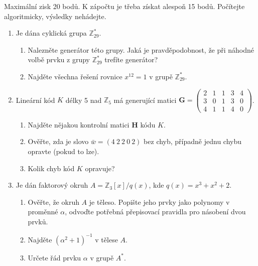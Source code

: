 \documentclass[11pt, a4paper]{article}
\begin{document}
\title{}
\author{Jakub Adamec\\B2M01TIK}

\maketitle
Maximální zisk 20 bodů. K zápočtu je třeba získat alespoň 15 bodů. Počítejte algoritmicky, výsledky nehádejte.
\begin{enumerate}
    \item \relax [4 body] Je dána cyklická grupa $\mathbb{Z}_{29}^*$.
    \begin{enumerate}
        \item \relax [2 body] Nalezněte generátor této grupy. Jaká je pravděpodobnost, že při náhodné volbě prvku z grupy $\mathbb{Z}_{29}^*$ trefíte generátor?
        \item \relax [2 body] Najděte všechna řešení rovnice $x^{12} = 1$ v grupě $\mathbb{Z}_{29}^*$.
    \end{enumerate}

    \item \relax [5 bodů] Lineární kód $K$ délky 5 nad $\mathbb{Z}_5$ má generující matici 
    $\mathbf{G} = \begin{pmatrix} 
    2 & 1 & 1 & 3 & 4 \\ 
    3 & 0 & 1 & 3 & 0 \\ 
    4 & 1 & 1 & 4 & 0 
    \end{pmatrix}$.
    \begin{enumerate}
        \item \relax [1 bod] Najděte nějakou kontrolní matici $\mathbf{H}$ kódu $K$.
        \item \relax [2 body] Ověřte, zda je slovo $\bar{w} = (4\ 2\ 2\ 0\ 2)$ bez chyb, případně jednu chybu opravte (pokud to lze).
        \item \relax [2 body] Kolik chyb kód $K$ opravuje?
    \end{enumerate}

    \item \relax [6 bodů] Je dán faktorový okruh $A = \mathbb{Z}_3[x]/q(x)$, kde $q(x) = x^3 + x^2 + 2$.
    \begin{enumerate}
        \item \relax [2 body] Ověřte, že okruh $A$ je těleso. Popište jeho prvky jako polynomy v proměnné $\alpha$, odvoďte potřebná přepisovací pravidla pro násobení dvou prvků.
        \item \relax [2 body] Najděte $(\alpha^2 + 1)^{-1}$ v tělese $A$.
        \item \relax [2 body] Určete řád prvku $\alpha$ v grupě $A^*$.
    \end{enumerate}


\end{enumerate}
\end{document}
